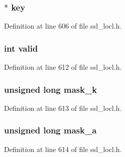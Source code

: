 \subsubsection[{\texorpdfstring{key}{key}}]{$\ast$ key}\hypertarget{structcert__st_afc02d65986dcb23f43889144cbaba6c3}{}\label{structcert__st_afc02d65986dcb23f43889144cbaba6c3}


Definition at line 606 of file ssl\+\_\+locl.\+h.

\subsubsection[{\texorpdfstring{valid}{valid}}]{\setlength{\rightskip}{0pt plus 5cm}int valid}\hypertarget{structcert__st_ac63b1f168765a53e565a8ba27f5469d1}{}\label{structcert__st_ac63b1f168765a53e565a8ba27f5469d1}


Definition at line 612 of file ssl\+\_\+locl.\+h.

\subsubsection[{\texorpdfstring{mask\+\_\+k}{mask_k}}]{\setlength{\rightskip}{0pt plus 5cm}unsigned long mask\+\_\+k}\hypertarget{structcert__st_a3c55369e7b44f6d24e0144acd29249db}{}\label{structcert__st_a3c55369e7b44f6d24e0144acd29249db}


Definition at line 613 of file ssl\+\_\+locl.\+h.

\subsubsection[{\texorpdfstring{mask\+\_\+a}{mask_a}}]{\setlength{\rightskip}{0pt plus 5cm}unsigned long mask\+\_\+a}\hypertarget{structcert__st_a7ac5672fb07289995fdf7c182f6c21ac}{}\label{structcert__st_a7ac5672fb07289995fdf7c182f6c21ac}


Definition at line 614 of file ssl\+\_\+locl.\+h.

